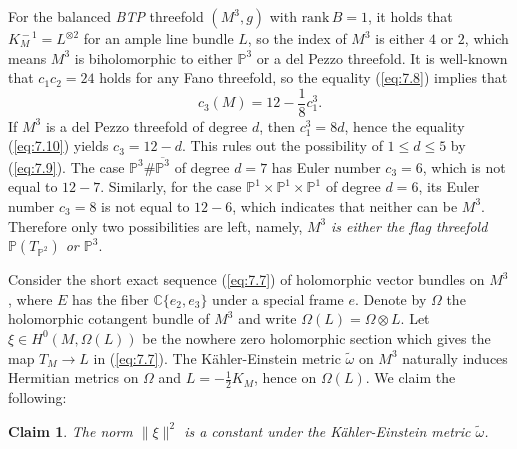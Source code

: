 \documentclass{amsart}
\numberwithin{equation}{section}
\newtheorem{claim}  [theorem]     {Claim}
\theoremstyle{definition}
\renewcommand{\1}{\mathds{1}}
\renewcommand{\>}{\rightarrow}
\begin{document}
For the balanced {\em BTP} threefold $(M^3,g)$ with $\mbox{rank}\,B=1$, it holds that $K_{\!M}^{\!-\!1}=L^{\otimes 2}$ for an ample line bundle $L$, so the index of $M^3$ is either $4$ or $2$, which means $M^3$ is biholomorphic to either ${\mathbb P}^3$ or a del Pezzo threefold. It is well-known that $c_1c_2=24$ holds for any Fano threefold, so the equality (\ref{eq:7.8}) implies that
\begin{equation} \label{eq:7.10}
c_3(M) = 12 - \frac{1}{8}c_1^3 .
\end{equation}
If $M^3$ is a del Pezzo threefold of degree $d$, then $c_1^3=8d$, hence the equality (\ref{eq:7.10}) yields $c_3=12-d$. This rules out the possibility of $1\leq d\leq 5$ by (\ref{eq:7.9}). The case ${\mathbb P}^3\# \overline{{\mathbb P}^3}$ of degree $d=7$ has Euler number $c_3=6$, which is not equal to $12-7$. Similarly, for the case ${\mathbb P}^1 \times {\mathbb P}^1 \times {\mathbb P}^1$ of degree $d=6$, its Euler number $c_3=8$ is not equal to $12-6$, which indicates that neither can be $M^3$. Therefore only two possibilities are left, namely, $M^3$ {\em is either the flag threefold  ${\mathbb P}(T_{{\mathbb P}^2} )$ or ${\mathbb P}^3$}.

\vspace{0.1cm}

Consider the short exact sequence (\ref{eq:7.7}) of holomorphic vector bundles on $M^3$, where $E$ has the fiber ${\mathbb C}\{ e_2,e_3\}$ under a special frame $e$. Denote by $\Omega$ the holomorphic cotangent bundle of $M^3$ and write $\Omega(L)=\Omega \otimes L$. Let $\xi \in H^0(M, \Omega (L))$ be the nowhere zero holomorphic section which gives the map $T_{\!M} \rightarrow L$ in (\ref{eq:7.7}). The K\"ahler-Einstein metric $\tilde{\omega}$ on $M^3$ naturally induces Hermitian metrics on $\Omega$ and $L=-\frac{1}{2}K_{\!M}$, hence on $\Omega (L)$. We claim the following:
\begin{claim}\label{cst_norm}
The norm $\parallel \!\xi \!\parallel^2$ is a constant under the K\"ahler-Einstein metric $\tilde{\omega}$.
\end{claim}
\end{document}
